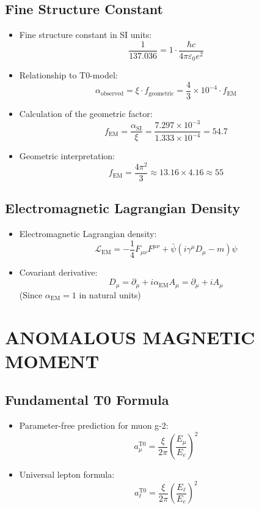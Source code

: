 \documentclass[12pt,a4paper]{article}
\begin{document}
	\subsection{Fine Structure Constant}
	\begin{itemize}
		\item Fine structure constant in SI units:
		$$\frac{1}{137.036} = 1 \cdot \frac{\hbar c}{4\pi\varepsilon_0 e^2}$$
		
		\item Relationship to T0-model:
		$$\alpha_{\text{observed}} = \xi \cdot f_{\text{geometric}} = \frac{4}{3} \times 10^{-4} \cdot f_{\text{EM}}$$
		
		\item Calculation of the geometric factor:
		$$f_{\text{EM}} = \frac{\alpha_{\text{SI}}}{\xi} = \frac{7.297 \times 10^{-3}}{1.333 \times 10^{-4}} = 54.7$$
		
		\item Geometric interpretation:
		$$f_{\text{EM}} = \frac{4\pi^2}{3} \approx 13.16 \times 4.16 \approx 55$$
	\end{itemize}
	
	\subsection{Electromagnetic Lagrangian Density}
	\begin{itemize}
		\item Electromagnetic Lagrangian density:
		$$\mathcal{L}_{\text{EM}} = -\frac{1}{4}F_{\mu\nu}F^{\mu\nu} + \bar{\psi}(i\gamma^\mu D_\mu - m)\psi$$
		
		\item Covariant derivative:
		$$D_\mu = \partial_\mu + i \alpha_{\text{EM}} A_\mu = \partial_\mu + i A_\mu$$
		(Since $\alpha_{\text{EM}} = 1$ in natural units)
	\end{itemize}
	
	\section{ANOMALOUS MAGNETIC MOMENT}
	
	\subsection{Fundamental T0 Formula}
	\begin{itemize}
		\item Parameter-free prediction for muon g-2:
		$$\boxed{a_\mu^{\text{T0}} = \frac{\xi}{2\pi} \left(\frac{E_\mu}{E_e}\right)^2}$$
		
		\item Universal lepton formula:
		$$\boxed{a_\ell^{\text{T0}} = \frac{\xi}{2\pi} \left(\frac{E_\ell}{E_e}\right)^2}$$
	\end{itemize}
	
\end{document}
